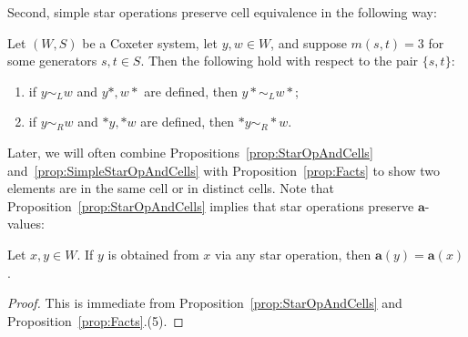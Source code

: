 \documentclass[ALCO,Unicode,published]{cedram}
\newcommand{\la}{\mathbf{a}}
\begin{document}
\noindent Second, simple star operations preserve cell equivalence in the following way: 
\begin{prop}[{\cite[Corollary 4.3]{KL}}]
    \label{prop:SimpleStarOpAndCells} 
    Let $(W,S)$ be a Coxeter system, let $y,w\in W$, and suppose $m(s,t)=3$ for some generators $s,t\in S$.  Then
    the following hold with respect to the pair $\{s,t\}$:
    \begin{enumerate}
        \item if  $y\sim_L w$ and $y*,w*$ are defined, then $y*\sim_L w*$;
        \item if $y\sim_R w$ and $*y,*w$ are defined, then $*y\sim_R *w$. 
    \end{enumerate}
\end{prop}

\noindent 
Later, we will often combine Propositions~\ref{prop:StarOpAndCells} and~\ref{prop:SimpleStarOpAndCells} with
Proposition~\ref{prop:Facts} to show two elements are in the same cell or in distinct cells. Note that
Proposition~\ref{prop:StarOpAndCells} implies that star operations preserve $\la$-values:

\begin{corollary}
    Let $x,y\in W$. If $y$ is obtained from $x$ via any star operation, then $\la(y)=\la(x)$.
    \label{coro:starA}
\end{corollary}
\begin{proof}
    This is immediate from Proposition~\ref{prop:StarOpAndCells} and Proposition~\ref{prop:Facts}.(5).
\end{proof}
\end{document}
